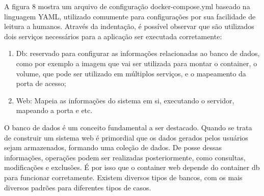 
A figura 8 mostra um arquivo de configuração docker-compose.yml baseado na linguagem YAML, utilizado comumente para configurações por sua facilidade de leitura a humanos. Através da indentação, é possível observar que são utilizados dois serviços necessários para a aplicação ser executada corretamente:

\begin{enumerate}
    \item Db: reservado para configurar as informações relacionadas ao banco de dados, como por exemplo a imagem que vai ser utilizada para montar o container, o volume, que pode ser utilizado em múltiplos serviços, e o mapeamento da porta de acesso;
    \item Web: Mapeia as informações do sistema em si, executando o servidor, mapeando a porta e etc.
\end{enumerate}

O banco de dados é um conceito fundamental a ser destacado. Quando se trata de construir um sistema web é primordial que os dados gerados pelos usuários sejam armazenados, formando uma coleção de dados. De posse dessas informações, operações podem ser realizadas posteriormente, como consultas, modificações e exclusões. É por isso que o container web depende do container db para funcionar corretamente. Existem diversos tipos de bancos, com os mais diversos padrões para diferentes tipos de casos.

